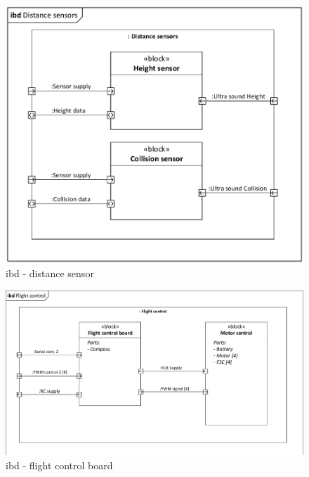 \begin{figure}[H]
\centering
\includegraphics[width=1\textwidth]{Billeder/IBD/ibd4_distancesensor.pdf}
\caption{ibd - distance sensor}
\label{fig:ibd_distancesensor}
\end{figure}

\begin{figure}[H]
\centering
\includegraphics[width=1\textwidth]{Billeder/IBD/ibd5_flightcontrolboard.pdf}
\caption{ibd - flight control board}
\label{fig:ibd_flightcontrolboard}
\end{figure}


